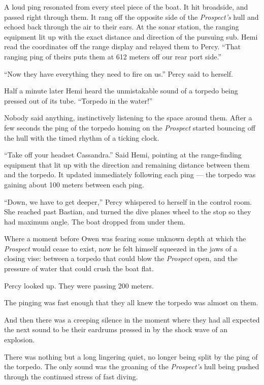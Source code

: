 \documentclass[]{scrbook}
\begin{document}
A loud ping resonated from every steel piece of the boat. It hit
broadside, and passed right through them. It rang off the opposite side
of the \emph{Prospect's} hull and echoed back through the air to their
ears. At the sonar station, the ranging equipment lit up with the exact
distance and direction of the pursuing sub. Hemi read the coordinates
off the range display and relayed them to Percy. ``That ranging ping of
theirs puts them at 612 meters off our rear port side.''

``Now they have everything they need to fire on us.'' Percy said to
herself.

Half a minute later Hemi heard the unmistakable sound of a torpedo being
pressed out of its tube. ``Torpedo in the water!''

Nobody said anything, instinctively listening to the space around them.
After a few seconds the ping of the torpedo homing on the
\emph{Prospect} started bouncing off the hull with the timed rhythm of a
ticking clock.

``Take off your headset Cassandra.'' Said Hemi, pointing at the
range-finding equipment that lit up with the direction and remaining
distance between them and the torpedo. It updated immediately following
each ping --- the torpedo was gaining about 100 meters between each
ping.

``Down, we have to get deeper,'' Percy whispered to herself in the
control room. She reached past Bastian, and turned the dive planes wheel
to the stop so they had maximum angle. The boat dropped from under them.

Where a moment before Owen was fearing some unknown depth at which the
\emph{Prospect} would cease to exist, now he felt himself squeezed in
the jaws of a closing vise: between a torpedo that could blow the
\emph{Prospect} open, and the pressure of water that could crush the
boat flat.

Percy looked up. They were passing 200 meters.

The pinging was fast enough that they all knew the torpedo was almost on
them.

And then there was a creeping silence in the moment where they had all
expected the next sound to be their eardrums pressed in by the shock
wave of an explosion.

There was nothing but a long lingering quiet, no longer being split by
the ping of the torpedo. The only sound was the groaning of the
\emph{Prospect's} hull being pushed through the continued stress of fast
diving.
\end{document}
